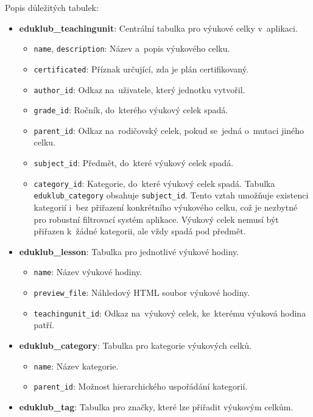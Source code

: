 \documentclass[male,czech,api_bc]{kitheses}
\begin{document}
Popis důležitých tabulek:
\begin{itemize}
	\item \textbf{eduklub\_teachingunit}: Centrální tabulka pro výukové celky v~aplikaci.
	\begin{itemize}
		\item \texttt{name}, \texttt{description}: Název a~popis výukového celku.
		\item \texttt{certificated}: Příznak určující, zda je plán certifikovaný.
		\item \texttt{author\_id}: Odkaz na~uživatele, který jednotku vytvořil.
		\item \texttt{grade\_id}: Ročník, do~kterého výukový celek spadá.
		\item \texttt{parent\_id}: Odkaz na~rodičovský celek, pokud se~jedná o~mutaci jiného celku.
		\item \texttt{subject\_id}: Předmět, do~které výukový celek spadá.
		\item \texttt{category\_id}: Kategorie, do~které výukový celek spadá. Tabulka \texttt{eduklub\_category} obsahuje \texttt{subject\_id}. Tento vztah umožňuje existenci kategorií i~bez přiřazení konkrétního výukového celku, což je nezbytné pro robustní filtrovací systém aplikace. Výukový celek nemusí být přiřazen k~žádné kategorii, ale vždy spadá pod předmět.
		
	\end{itemize}
	
	\item \textbf{eduklub\_lesson}: Tabulka pro jednotlivé výukové hodiny.
	\begin{itemize}
		\item \texttt{name}: Název výukové hodiny.
		\item \texttt{preview\_file}: Náhledový HTML soubor výukové hodiny.
		\item \texttt{teachingunit\_id}: Odkaz na~výukový celek, ke~kterému výuková hodina patří.
	\end{itemize}
	
	\item \textbf{eduklub\_category}: Tabulka pro kategorie výukových celků.
	\begin{itemize}
		\item \texttt{name}: Název kategorie.
		\item \texttt{parent\_id}: Možnost hierarchického uspořádání kategorií.
	\end{itemize}
	
	\item \textbf{eduklub\_tag}: Tabulka pro značky, které lze přiřadit výukovým celkům.
	

\end{itemize}
\end{document}
